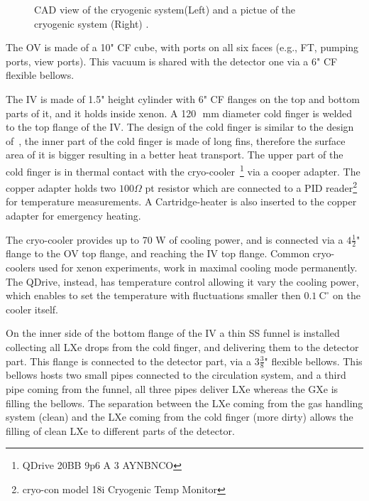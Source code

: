 \begin{figure}
\begin{subfigure}[c]{0.25\textheight}
					           \end{subfigure}
						           \caption{ CAD view of the cryogenic system(Left) and a pictue of the cryogenic system (Right) . \label{fig:cryo}}
						   \end{figure}

The OV is made of a 10" CF cube, with ports on all six faces (e.g., FT, pumping ports, view ports). This vacuum is shared with the detector one via a 6" CF flexible bellows.

The IV is made of 1.5" height cylinder with 6" CF flanges on the top and bottom parts of it, and it holds inside xenon. A 120~\,mm diameter cold finger is welded to the top flange of the IV. The design of the cold finger is similar to the design of~\cite{xe100_instr2012}, the inner 
part of the cold finger is made of long fins, therefore the surface area of it is bigger resulting in a better heat transport. The upper 
part of the cold finger is in thermal contact with the cryo-cooler~\footnote{QDrive 20BB 9p6 A 3 AYNBNCO} via a cooper adapter. The copper 
adapter holds two $100\Omega$ pt resistor which are connected to a PID reader\footnote{cryo-con model 18i Cryogenic Temp Monitor} for 
temperature measurements. A Cartridge-heater is also inserted to the copper adapter for emergency heating. 

The cryo-cooler provides up to 70 W of cooling power, and is connected via a $4\frac{1}{2}$" flange to the OV top flange, and reaching the IV top flange. 
Common cryo-coolers used for xenon experiments, work in maximal cooling mode permanently. The QDrive, instead, has temperature control allowing 
it vary the cooling power, which enables to set the temperature with fluctuations smaller then $0.1~\mathrm{C^{\circ}}$ on the cooler itself.

On the inner side of the bottom flange of the IV a thin SS funnel is installed collecting all LXe drops from the cold finger, and delivering 
them to the  detector part. This flange is connected to the detector part, via a $3\frac{3}{8}$" flexible bellows. This bellows hosts two small pipes 
connected to the circulation system, and a third pipe coming from the funnel, all three pipes deliver LXe whereas the GXe is filling the bellows. The separation between the LXe coming from the gas handling system (clean) and the LXe coming from the cold finger (more dirty) allows the filling of clean LXe to different parts of the detector. 
